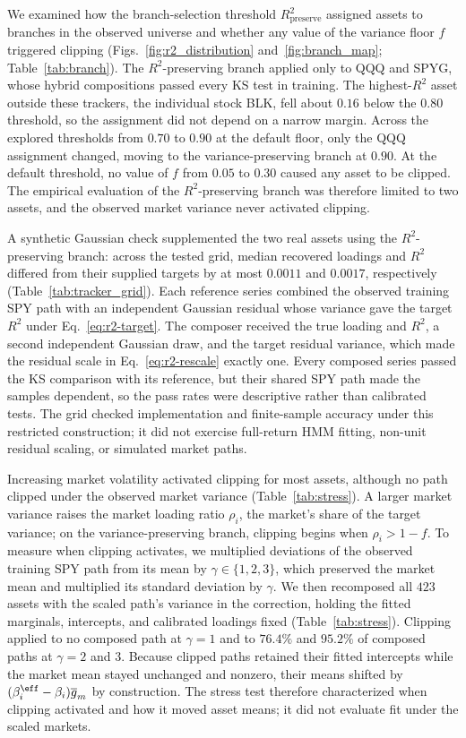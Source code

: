 We examined how the branch-selection threshold
$R^2_{\mathrm{preserve}}$ assigned assets to branches in the observed
universe and whether any value of the variance floor $f$ triggered
clipping (Figs.~\ref{fig:r2_distribution}
and~\ref{fig:branch_map}; Table~\ref{tab:branch}). The
$R^2$-preserving branch applied only to QQQ and SPYG, whose hybrid
compositions passed every KS test in training. The highest-$R^2$ asset
outside these trackers, the individual stock BLK, fell about $0.16$
below the $0.80$ threshold, so the assignment did not depend on a
narrow margin. Across the explored thresholds from $0.70$ to $0.90$ at
the default floor, only the QQQ assignment changed, moving to the
variance-preserving branch at $0.90$. At the default threshold, no
value of $f$ from $0.05$ to $0.30$ caused any asset to be clipped. The
empirical evaluation of the $R^2$-preserving branch was therefore
limited to two assets, and the observed market variance never
activated clipping.

A synthetic Gaussian check supplemented the two real assets using
the $R^2$-preserving branch: across the tested grid, median recovered
loadings and $R^2$ differed from their supplied targets by at most
$0.0011$ and $0.0017$, respectively (Table~\ref{tab:tracker_grid}).
Each reference series combined the observed training SPY path with an
independent Gaussian residual whose variance gave the target $R^2$
under Eq.~\eqref{eq:r2-target}. The composer received the true
loading and $R^2$, a second independent Gaussian draw, and the target
residual variance, which made the residual scale in
Eq.~\eqref{eq:r2-rescale} exactly one. Every composed series passed
the KS comparison with its reference, but their shared SPY path made
the samples dependent, so the pass rates were descriptive rather than
calibrated tests. The grid checked implementation and finite-sample
accuracy under this restricted construction; it did not exercise
full-return HMM fitting, non-unit residual scaling, or simulated
market paths.

Increasing market volatility activated clipping for most assets,
although no path clipped under the observed market variance
(Table~\ref{tab:stress}). A larger market variance raises the market
loading ratio $\rho_i$, the market's share of the target variance;
on the variance-preserving branch, clipping begins when
$\rho_i>1-f$. To measure when clipping activates, we
multiplied deviations of the observed training SPY path from its mean
by $\gamma\in\{1,2,3\}$, which preserved the market mean and
multiplied its standard deviation by $\gamma$. We then recomposed all
$423$ assets with the scaled path's variance in the correction,
holding the fitted marginals, intercepts, and calibrated loadings
fixed (Table~\ref{tab:stress}). Clipping applied to no composed path
at $\gamma=1$ and to $76.4\%$ and $95.2\%$ of composed paths at
$\gamma=2$ and $3$. Because clipped paths retained their fitted
intercepts while the market mean stayed unchanged and nonzero, their
means shifted by $(\beta_i^{\eff}-\beta_i)\overline{g}_m$ by
construction. The stress test therefore characterized when clipping
activated and how it moved asset means; it did not evaluate fit under
the scaled markets.
